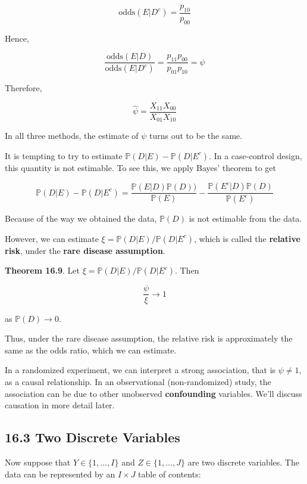 {\[\text{odds}(E | D^c) = \frac{p_{10}}{p_{00}}\]

Hence,

\[\frac{\text{odds}(E | D)}{\text{odds}(E | D^c)} = \frac{p_{11} p_{00}}{p_{01} p_{10}} = \psi\]

Therefore,

\[\hat{\psi} = \frac{X_{11} X_{00}}{X_{01} X_{10}}\]

In all three methods, the estimate of \(\psi\) turns out to be the same.

It is tempting to try to estimate
\(\mathbb{P}(D | E) - \mathbb{P}(D | E^c)\). In a case-control design,
this quantity is not estimable. To see this, we apply Bayes' theorem to
get

\[\mathbb{P}(D | E) - \mathbb{P}(D | E^c) = \frac{\mathbb{P}(E | D) \mathbb{P}(D))}{\mathbb{P}(E)} - \frac{\mathbb{P}(E^c | D) \mathbb{P}(D)}{\mathbb{P}(E^c)}\]

Because of the way we obtained the data, \(\mathbb{P}(D)\) is not
estimable from the data.

However, we can estimate
\(\xi = \mathbb{P}(D | E) / \mathbb{P}(D | E^c)\), which is called the
\textbf{relative risk}, under the \textbf{rare disease assumption}.

\textbf{Theorem 16.9}. Let
\(\xi = \mathbb{P}(D | E) / \mathbb{P}(D | E^c)\). Then

\[ \frac{\psi}{\xi} \rightarrow 1\]

as \(\mathbb{P}(D) \rightarrow 0\).

Thus, under the rare disease assumption, the relative risk is
approximately the same as the odds ratio, which we can estimate.

In a randomized experiment, we can interpret a strong association, that
is \(\psi \neq 1\), as a causal relationship. In an observational
(non-randomized) study, the association can be due to other unobserved
\textbf{confounding} variables. We'll discuss causation in more detail
later.

\subsection{16.3 Two Discrete
Variables}\label{two-discrete-variables}

Now suppose that \(Y \in \{ 1, \dots, I \}\) and
\(Z \in \{ 1, \dots, J \}\) are two discrete variables. The data can be
represented by an \(I \times J\) table of contents:

}
